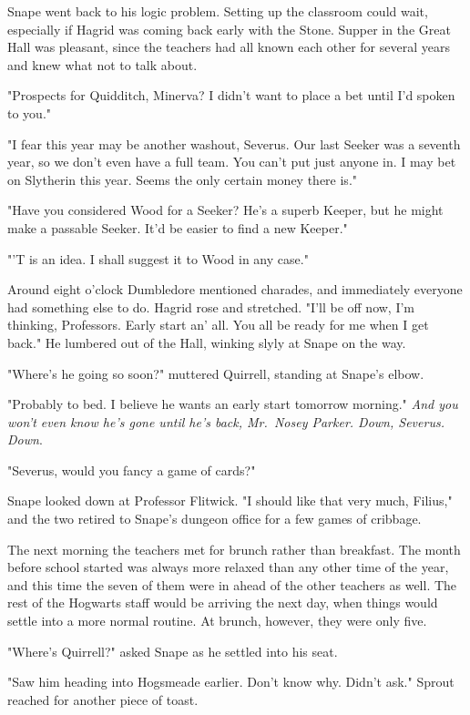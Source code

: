 Snape went back to his logic problem. Setting up the classroom could wait, especially if Hagrid was coming back early with the Stone. Supper in the Great Hall was pleasant, since the teachers had all known each other for several years and knew what not to talk about.

"Prospects for Quidditch, Minerva? I didn't want to place a bet until I'd spoken to you."

"I fear this year may be another washout, Severus. Our last Seeker was a seventh year, so we don't even have a full team. You can't put just anyone in. I may bet on Slytherin this year. Seems the only certain money there is."

"Have you considered Wood for a Seeker? He's a superb Keeper, but he might make a passable Seeker. It'd be easier to find a new Keeper."

"'T is an idea. I shall suggest it to Wood in any case."

Around eight o'clock Dumbledore mentioned charades, and immediately everyone had something else to do. Hagrid rose and stretched. "I'll be off now, I'm thinking, Professors. Early start an' all. You all be ready for me when I get back." He lumbered out of the Hall, winking slyly at Snape on the way.

"Where's he{\el} going so soon?" muttered Quirrell, standing at Snape's elbow.

"Probably to bed. I believe he wants an early start tomorrow morning." \emph{And you won't even know he's gone until he's back, Mr.~Nosey Parker. Down, Severus. Down}.

"Severus, would you fancy a game of cards?"

Snape looked down at Professor Flitwick. "I should like that very much, Filius," and the two retired to Snape's dungeon office for a few games of cribbage.

The next morning the teachers met for brunch rather than breakfast. The month before school started was always more relaxed than any other time of the year, and this time the seven of them were in ahead of the other teachers as well. The rest of the Hogwarts staff would be arriving the next day, when things would settle into a more normal routine. At brunch, however, they were only five.

"Where's Quirrell?" asked Snape as he settled into his seat.

"Saw him heading into Hogsmeade earlier. Don't know why. Didn't ask." Sprout reached for another piece of toast.


